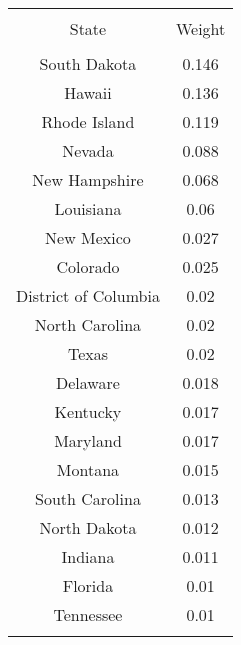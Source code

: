 
\begin{table}[!htbp] \centering 
  \caption{} 
  \label{} 
\begin{tabular}{@{\extracolsep{5pt}} cc} 
\\[-1.8ex]\hline 
\hline \\[-1.8ex] 
State & Weight \\ 
\hline \\[-1.8ex] 
South Dakota & 0.146 \\ 
Hawaii & 0.136 \\ 
Rhode Island & 0.119 \\ 
Nevada & 0.088 \\ 
New Hampshire & 0.068 \\ 
Louisiana & 0.06 \\ 
New Mexico & 0.027 \\ 
Colorado & 0.025 \\ 
District of Columbia & 0.02 \\ 
North Carolina & 0.02 \\ 
Texas & 0.02 \\ 
Delaware & 0.018 \\ 
Kentucky & 0.017 \\ 
Maryland & 0.017 \\ 
Montana & 0.015 \\ 
South Carolina & 0.013 \\ 
North Dakota & 0.012 \\ 
Indiana & 0.011 \\ 
Florida & 0.01 \\ 
Tennessee & 0.01 \\ 
\hline \\[-1.8ex] 
\end{tabular} 
\end{table} 
